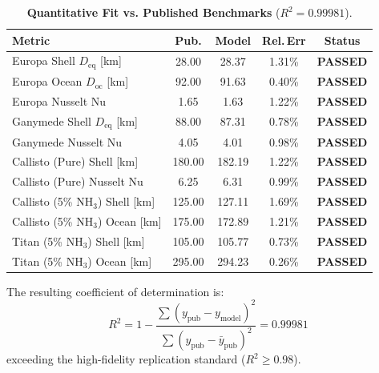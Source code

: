 \documentclass[10pt,twocolumn,letterpaper]{article}
\begin{document}
\begin{table}[h!]
\centering
\footnotesize
\setlength{\tabcolsep}{3.5pt}
\caption{\textbf{Quantitative Fit vs. Published Benchmarks} ($R^2 = 0.99981$).}
\label{tab:benchmarks}
\begin{tabular}{lcccc}
\toprule
\textbf{Metric} & \textbf{Pub.} & \textbf{Model} & \textbf{Rel.\,Err} & \textbf{Status} \\
\midrule
Europa Shell $D_{\mathrm{eq}}$ [km] & 28.00 & 28.37 & 1.31\% & \textbf{PASSED} \\
Europa Ocean $D_{\mathrm{oc}}$ [km] & 92.00 & 91.63 & 0.40\% & \textbf{PASSED} \\
Europa Nusselt $\mathrm{Nu}$ & 1.65 & 1.63 & 1.22\% & \textbf{PASSED} \\
Ganymede Shell $D_{\mathrm{eq}}$ [km] & 88.00 & 87.31 & 0.78\% & \textbf{PASSED} \\
Ganymede Nusselt $\mathrm{Nu}$ & 4.05 & 4.01 & 0.98\% & \textbf{PASSED} \\
Callisto (Pure) Shell [km] & 180.00 & 182.19 & 1.22\% & \textbf{PASSED} \\
Callisto (Pure) Nusselt $\mathrm{Nu}$ & 6.25 & 6.31 & 0.99\% & \textbf{PASSED} \\
Callisto (5\% $\mathrm{NH}_3$) Shell [km] & 125.00 & 127.11 & 1.69\% & \textbf{PASSED} \\
Callisto (5\% $\mathrm{NH}_3$) Ocean [km] & 175.00 & 172.89 & 1.21\% & \textbf{PASSED} \\
Titan (5\% $\mathrm{NH}_3$) Shell [km] & 105.00 & 105.77 & 0.73\% & \textbf{PASSED} \\
Titan (5\% $\mathrm{NH}_3$) Ocean [km] & 295.00 & 294.23 & 0.26\% & \textbf{PASSED} \\
\bottomrule
\end{tabular}
\end{table}


The resulting coefficient of determination is:
\begin{equation}
R^2 = 1 - \frac{\sum (y_{\mathrm{pub}} - y_{\mathrm{model}})^2}{\sum (y_{\mathrm{pub}} - \bar{y}_{\mathrm{pub}})^2} = 0.99981
\end{equation}
exceeding the high-fidelity replication standard ($R^2 \ge 0.98$).
\end{document}
